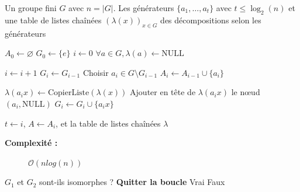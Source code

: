 \documentclass[12pt]{article}
\begin{document}
\begin{algorithm}[H]
\caption{Générateurs et décompositions}
\begin{algorithmic}[1]
    \Require Un groupe fini $G$ avec $n = |G|$.
    \Ensure Les générateurs $\{a_1, \dots, a_t\}$ avec $t \le \log_2(n)$ et une table de listes chaînées $(\lambda(x))_{x \in G}$ des décompositions selon les générateurs
    
    \Statex \hrulefill %
    
    \State $A_0 \gets \varnothing$
    \State $G_0 \gets \{e\}$
    \State $i \gets 0$
    \State $\forall a \in G, \lambda(a) \gets \text{NULL}$
    
        \State $i \gets i + 1$
        \State $G_i \gets G_{i-1}$
        \State Choisir $a_i \in G \setminus G_{i-1}$
        \State $A_i \gets A_{i-1} \cup \{a_i\}$
        
            \State $\lambda(a_i x) \gets \text{CopierListe}(\lambda(x))$
            \State Ajouter en tête de $\lambda(a_i x)$ le nœud $(a_i, \text{NULL})$
            \State $G_i \gets G_i \cup \{a_i x\}$
        \EndFor
    \EndWhile
    
    \State \Return $t \gets i$, $A \gets A_i$, et la table de listes chaînées $\lambda$
\end{algorithmic}
\end{algorithm}
\begin{description}
    \item[\textbf{Complexité :}] $\mathcal{O}(nlog(n))$
\end{description}

\begin{algorithm}[H]
\caption{IsoGroupeDéc (général)}
\begin{algorithmic}[1]
    \Ensure $G_1$ et $G_2$ sont-ils isomorphes ?
                \State \textbf{Quitter la boucle}
            \EndIf
        \EndFor
            \State \Return Vrai
        \EndIf
    \EndFor
\State \Return Faux
\end{algorithmic}
\end{algorithm}
\end{document}
